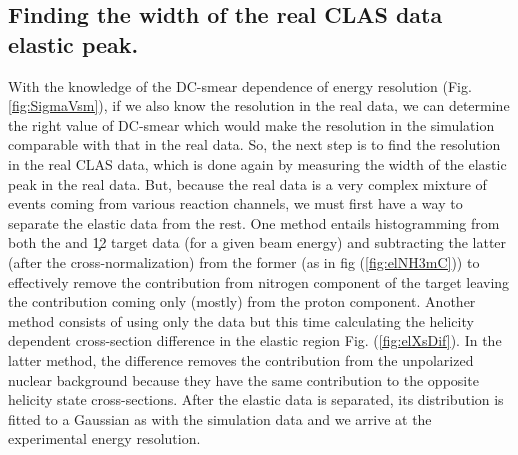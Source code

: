 \subsection{Finding the width of the real CLAS data elastic peak.}
With the knowledge of the DC-smear dependence of energy resolution (Fig. \ref{fig:SigmaVsm}), if we also know the resolution in the real data, 
we can determine the right value of DC-smear which would make the resolution in the simulation comparable with that in the real data. So, 
the next step is to find the resolution in the real CLAS data, which is done again by measuring the width of the elastic peak in the real data. 
But, because the real data is a very complex mixture of events coming from various reaction channels, we must first have a way to separate the elastic 
data from the rest. One method entails histogramming \dE from both the  and \c12 target data (for a given beam energy) and subtracting 
the latter (after the cross-normalization) from the former (as in fig (\ref{fig:elNH3mC})) to effectively remove the contribution from nitrogen 
component of the  target leaving the contribution coming only (mostly) 
from the proton component. Another method consists of using only the  data but this time calculating the helicity dependent cross-section 
difference in the elastic region Fig. (\ref{fig:elXsDif}). In the latter method, the difference removes the contribution from the unpolarized 
nuclear background because they have the same contribution to the opposite helicity state cross-sections. After the elastic data is separated, its 
\dE distribution is fitted to a Gaussian as with the simulation data and we arrive at the experimental energy resolution. 



